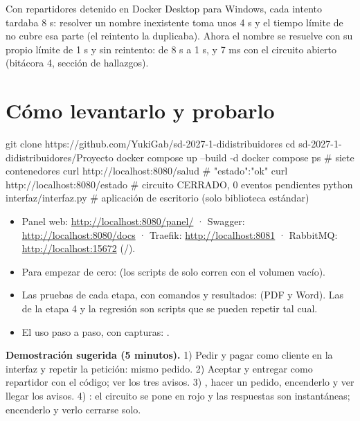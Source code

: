 \documentclass[11pt]{article}
\begin{document}
\begin{nota}
Con repartidores detenido en Docker Desktop para Windows, cada intento tardaba 8 s: resolver un nombre
inexistente toma unos 4 s y el tiempo límite de  no cubre esa parte (el reintento la
duplicaba). Ahora el nombre se resuelve con su propio límite de 1 s y sin reintento: de 8 s a 1 s, y
7 ms con el circuito abierto (bitácora 4, sección de hallazgos).
\end{nota}

\section{Cómo levantarlo y probarlo}

\begin{comando}
git clone https://github.com/YukiGab/sd-2027-1-didistribuidores
cd sd-2027-1-didistribuidores/Proyecto
docker compose up --build -d
docker compose ps                       # siete contenedores
curl http://localhost:8080/salud        # {"estado":"ok"}
curl http://localhost:8080/estado       # circuito CERRADO, 0 eventos pendientes
python interfaz/interfaz.py             # aplicación de escritorio (solo biblioteca estándar)
\end{comando}

\begin{itemize}
  \item Panel web: \url{http://localhost:8080/panel/} · Swagger: \url{http://localhost:8080/docs} ·
        Traefik: \url{http://localhost:8081} · RabbitMQ: \url{http://localhost:15672} (/).
  \item Para empezar de cero:  (los scripts de  solo corren con el
        volumen vacío).
  \item Las pruebas de cada etapa, con comandos y resultados:  (PDF y Word).
        Las de la etapa 4 y la regresión son scripts que se pueden repetir tal cual.
  \item El uso paso a paso, con capturas: .
\end{itemize}

\textbf{Demostración sugerida (5 minutos).} 1) Pedir y pagar como cliente en la interfaz y repetir la
petición: mismo pedido. 2) Aceptar y entregar como repartidor con el código; ver los tres avisos.
3) , hacer un pedido, encenderlo y ver llegar los avisos.
4) : el circuito se pone en rojo y las respuestas son instantáneas;
encenderlo y verlo cerrarse solo.
\end{document}
